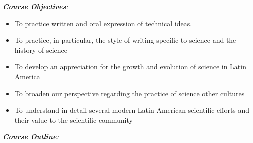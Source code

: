 \documentclass[10pt]{article}
\begin{document}
\noindent
\textit{\textbf{Course Objectives}:}
\begin{itemize}
\item To practice written and oral expression of technical ideas.
\item To practice, in particular, the style of writing specific to science and the history of science
\item To develop an appreciation for the growth and evolution of science in Latin America
\item To broaden our perspective regarding the practice of science other cultures
\item To understand in detail several modern Latin American scientific efforts and their value to the scientific community
\end{itemize}
\clearpage
\twocolumn
\textit{\textbf{Course Outline}:}
\end{document}
